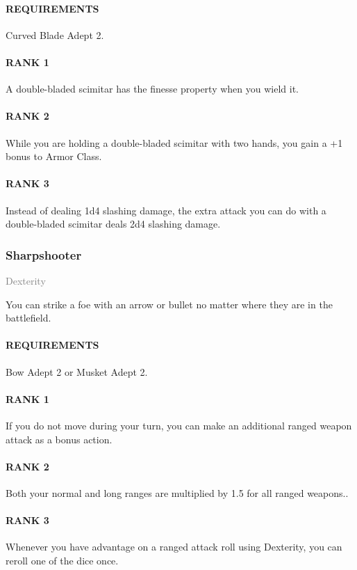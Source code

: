 \paragraph{REQUIREMENTS} Curved Blade Adept 2.
\paragraph{RANK 1} A double-bladed scimitar has the finesse property when you wield it.
\paragraph{RANK 2} While you are holding a double-bladed scimitar with two hands, you gain a +1 bonus to Armor Class.
\paragraph{RANK 3} Instead of dealing 1d4 slashing damage, the extra attack you can do with a double-bladed scimitar deals 2d4 slashing damage.

\subsubsection{Sharpshooter} \label{feat::sharpshooter}
\small{\textcolor{gray}{Dexterity}}

\normalsize
You can strike a foe with an arrow or bullet no matter where they are in the battlefield.
\paragraph{REQUIREMENTS} Bow Adept 2 or Musket Adept 2.
\paragraph{RANK 1} If you do not move during your turn, you can make an additional ranged weapon attack as a bonus action.
\paragraph{RANK 2} Both your normal and long ranges are multiplied by 1.5 for all ranged weapons..
\paragraph{RANK 3} Whenever you have advantage on a ranged attack roll using Dexterity, you can reroll one of the dice once.

